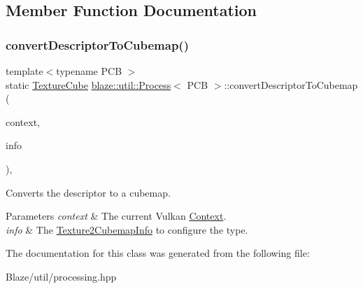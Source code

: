 \subsection{Member Function Documentation}
\mbox{\label{classblaze_1_1util_1_1Process_aacdf156de09d7da2925e6033367d07a2}} 
\subsubsection{\texorpdfstring{convert\+Descriptor\+To\+Cubemap()}{convertDescriptorToCubemap()}}
{\footnotesize\ttfamily template$<$typename P\+CB $>$ \\
static \hyperlink{classblaze_1_1TextureCube}{Texture\+Cube} \hyperlink{classblaze_1_1util_1_1Process}{blaze\+::util\+::\+Process}$<$ P\+CB $>$\+::convert\+Descriptor\+To\+Cubemap (\begin{DoxyParamCaption}\item[{const \hyperlink{classblaze_1_1Context}{Context} \&}]{context,  }\item[{const \hyperlink{structblaze_1_1util_1_1Texture2CubemapInfo}{Texture2\+Cubemap\+Info}$<$ P\+CB $>$ \&}]{info }\end{DoxyParamCaption})\hspace{0.3cm}{\ttfamily [inline]}, {\ttfamily [static]}}



Converts the descriptor to a cubemap. 


\begin{DoxyParams}{Parameters}
{\em context} & The current Vulkan \hyperlink{classblaze_1_1Context}{Context}. \\
\hline
{\em info} & The \hyperlink{structblaze_1_1util_1_1Texture2CubemapInfo}{Texture2\+Cubemap\+Info} to configure the type. \\
\hline
\end{DoxyParams}


The documentation for this class was generated from the following file\+:\begin{DoxyCompactItemize}
\item 
Blaze/util/processing.\+hpp\end{DoxyCompactItemize}
